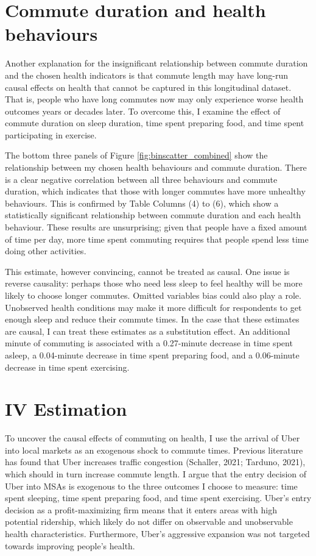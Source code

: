 \documentclass{eco481_paper}
\begin{document}

\section*{Commute duration and health behaviours}
Another explanation for the insignificant relationship between commute duration and the chosen health indicators is that commute length may have long-run causal effects on health that cannot be captured in this longitudinal dataset. That is, people who have long commutes now may only experience worse health outcomes years or decades later. To overcome this, I examine the effect of commute duration on sleep duration, time spent preparing food, and time spent participating in exercise.  

The bottom three panels of Figure \ref*{fig:binscatter_combined} show the relationship between my chosen health behaviours and commute duration. There is a clear negative correlation between all three behaviours and commute duration, which indicates that those with longer commutes have more unhealthy behaviours. This is confirmed by Table Columns (4) to (6), which show a statistically significant relationship between commute duration and each health behaviour. These results are unsurprising; given that people have a fixed amount of time per day, more time spent commuting requires that people spend less time doing other activities. 

This estimate, however convincing, cannot be treated as causal. One issue is reverse causality: perhaps those who need less sleep to feel healthy will be more likely to choose longer commutes. Omitted variables bias could also play a role. Unobserved health conditions may make it more difficult for respondents to get enough sleep and reduce their commute times. In the case that these estimates are causal, I can treat these estimates as a substitution effect. An additional minute of commuting is associated with a 0.27-minute decrease in time spent asleep, a 0.04-minute decrease in time spent preparing food, and a 0.06-minute decrease in time spent exercising.

\section*{IV Estimation}
To uncover the causal effects of commuting on health, I use the arrival of Uber into local markets as an exogenous shock to commute times. Previous literature has found that Uber increases traffic congestion (Schaller, 2021; Tarduno, 2021), which should in turn increase commute length. I argue that the entry decision of Uber into MSAs is exogenous to the three outcomes I choose to measure: time spent sleeping, time spent preparing food, and time spent exercising. Uber’s entry decision as a profit-maximizing firm means that it enters areas with high potential ridership, which likely do not differ on observable and unobservable health characteristics. Furthermore, Uber’s aggressive expansion was not targeted towards improving people’s health.
\end{document}
